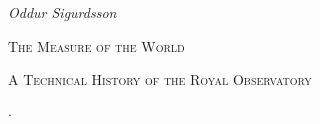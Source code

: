 %
%
%

\thispagestyle{empty}

\begin{flushleft}
\setlength{\parindent}{0pt}

\vspace*{\fill}

{\normalfont\itshape\fontsize{14}{16.8}\selectfont Oddur Sigurdsson\par}
\vspace{1.5em}

{\normalfont\scshape\fontsize{24}{28.8}\selectfont The Measure of the World\par}
\vspace{0.5em}

{\normalfont\scshape\fontsize{14}{16.8}\selectfont A Technical History of the Royal Observatory\par}
\vspace{2em}

{\normalfont\fontsize{12}{14.4}\selectfont \bookdescription\par}

\vspace*{\fill}

{\normalfont\fontsize{11}{13.2}\selectfont \editionname\enspace$\cdot$\enspace\editiondate\par}

\end{flushleft}

\clearpage

